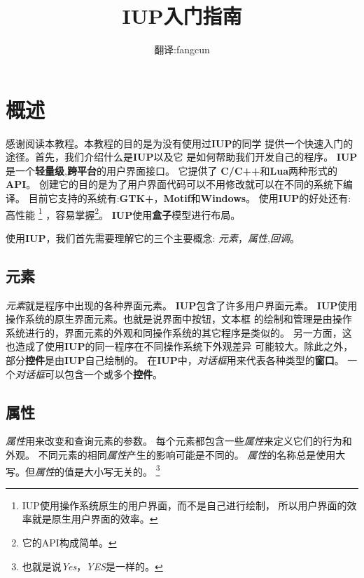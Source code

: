 \documentclass{ctexart}
\title{IUP入门指南}
\author{翻译:fangcun}
\begin{document}
\maketitle

\newpage

\tableofcontents

\newpage

\section{概述}

感谢阅读本教程。本教程的目的是为没有使用过\textbf{IUP}的同学
提供一个快速入门的途径。首先，我们介绍什么是\textbf{IUP}以及它
是如何帮助我们开发自己的程序。
\textbf{IUP}是一个\textbf{轻量级},\textbf{跨平台}的用户界面接口。
它提供了
\textbf{C/C++}和\textbf{Lua}两种形式的\textbf{API}。
创建它的目的是为了用户界面代码可以不用修改就可以在不同的系统下编译。
目前它支持的系统有:\textbf{GTK+}，\textbf{Motif}和\textbf{Windows}。
使用\textbf{IUP}的好处还有:高性能
\footnote{IUP使用操作系统原生的用户界面，而不是自己进行绘制，
所以用户界面的效率就是原生用户界面的效率。}
，容易掌握\footnote{它的API构成简单。}。
\textbf{IUP}使用\textbf{盒子}模型进行布局。

使用\textbf{IUP}，我们首先需要理解它的三个主要概念:
\emph{元素}，\emph{属性},\emph{回调}。

\subsection{元素}

\emph{元素}就是程序中出现的各种界面元素。
\textbf{IUP}包含了许多用户界面元素。
\textbf{IUP}使用操作系统的原生界面元素。也就是说界面中按钮，文本框
的绘制和管理是由操作系统进行的，界面元素的外观和同操作系统的其它程序是类似的。
另一方面，这也造成了使用\textbf{IUP}的同一程序在不同操作系统下外观差异
可能较大。除此之外，部分\textbf{控件}是由\textbf{IUP}自己绘制的。
在\textbf{IUP}中，\emph{对话框}用来代表各种类型的\textbf{窗口}。
一个\emph{对话框}可以包含一个或多个\textbf{控件}。

\subsection{属性}

\emph{属性}用来改变和查询元素的参数。
每个元素都包含一些\emph{属性}来定义它们的行为和外观。
不同元素的相同\emph{属性}产生的影响可能是不同的。
\emph{属性}的名称总是使用大写。但\emph{属性}的值是大小写无关的。
\footnote{也就是说\emph{Yes}，\emph{YES}是一样的。}
\end{document}
